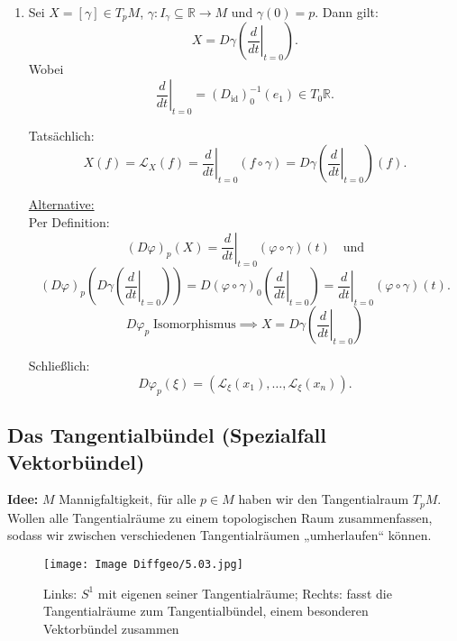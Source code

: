 \documentclass[fleqn, 12pt, letterpaper]{article}
\newcommand{\txt}[1]{\text{#1}}
\begin{document}
\begin{enumerate}[label=\roman*), start=7]
    \item Sei \(X = [\gamma]\in T_p M\), \(\gamma: I_\gamma \subseteq\mathbb{R} \to M\) und \(\gamma(0) = p\). Dann gilt:
    \[
    X = D\gamma\left( \left. \frac{d}{dt} \right|_{t=0} \right).
    \]
    Wobei
    \[
    \left. \frac{d}{dt} \right|_{t=0} = (D_{\mathrm{id}})_0^{-1}(e_1) \in T_0 \mathbb{R}.
    \]

    \vspace{1em}
    
    Tatsächlich:
    \[
    X(f) = \mathcal{L}_X(f) = \left. \frac{d}{dt} \right|_{t=0}(f\circ\gamma) = D\gamma(\left. \frac{d}{dt} \right|_{t=0})(f).
    \]

    \vspace{1em}
    
    \underline{Alternative:} \\
    Per Definition:
    \[
    (D\varphi)_p(X) = \left. \frac{d}{dt} \right|_{t=0} (\varphi \circ \gamma)(t)
    \quad \text{und}
    \]
    \[
    (D\varphi)_p\left( D\gamma\left( \left. \frac{d}{dt} \right|_{t=0} \right) \right) = D( \varphi\circ\gamma)_0(\left. \frac{d}{dt} \right|_{t=0} ) = \left. \frac{d}{dt} \right|_{t=0} (\varphi\circ\gamma)(t).
    \]
    \[D\varphi_p\;\txt{Isomorphismus}\implies X = D\gamma(\left. \frac{d}{dt} \right|_{t=0})\]

    \vspace{1em}

    Schließlich:
    \[
    D\varphi_p(\xi) = (\mathcal{L}_\xi(x_1), \dotsc, \mathcal{L}_\xi(x_n)).
    \]
\end{enumerate}

\subsection{Das Tangentialbündel (Spezialfall Vektorbündel)}

\textbf{Idee:} \(M\) Mannigfaltigkeit, für alle \(p \in M\) haben wir den Tangentialraum \(T_p M\).  
Wollen alle Tangentialräume zu einem topologischen Raum zusammenfassen, sodass wir zwischen verschiedenen Tangentialräumen „umherlaufen“ können.


      \begin{figure}[H]
    \centering
    \texttt{[image: Image Diffgeo/5.03.jpg]}
	\caption{Links: $S^1$ mit eigenen seiner Tangentialräume; Rechts: fasst die Tangentialräume zum Tangentialbündel, einem besonderen Vektorbündel zusammen}
 \end{figure}
\end{document}
